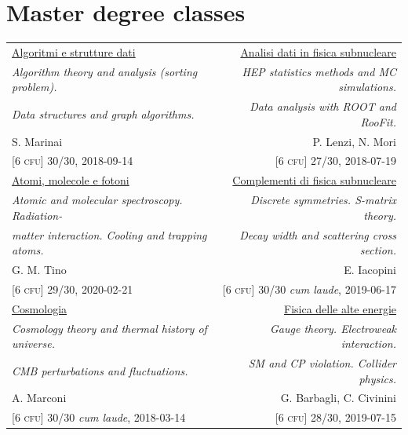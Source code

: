 \documentclass[a4, 11pt]{report}
\begin{document}
    \pagebreak

    \section*{Master degree classes}
        \begin{tabular*}{\textwidth}{l @{\extracolsep{\fill}} r}
            {\ul {Algoritmi e strutture dati}} & {\ul {Analisi dati in fisica subnucleare}}\\
            {\small \emph {Algorithm theory and analysis (sorting problem).}} & {\small \emph {HEP statistics methods and MC simulations.}}\\
            {\small \emph {Data structures and graph algorithms.}} & {\small \emph {Data analysis with ROOT and RooFit.}}\\
            {\small S. Marinai} & {\small P. Lenzi, N. Mori}\\
            {\small [6 \textsc{cfu}] 30/30, 2018-09-14} & {\small [6 \textsc{cfu}] 27/30, 2018-07-19}\\ [3mm]

            {\ul {Atomi, molecole e fotoni}} & {\ul {Complementi di fisica subnucleare}}\\
            {\small \emph {Atomic and molecular spectroscopy. Radiation-}} & {\small \emph {Discrete symmetries. S-matrix theory.}}\\
            {\small \emph {matter interaction. Cooling and trapping atoms.}} & {\small \emph {Decay width and scattering cross section.}}\\
            {\small G. M. Tino} & {\small E. Iacopini}\\
            {\small [6 \textsc{cfu}] 29/30, 2020-02-21} & {\small [6 \textsc{cfu}] 30/30 \textit{cum laude}, 2019-06-17}\\ [3mm]

            {\ul {Cosmologia}} & {\ul {Fisica delle alte energie}}\\
            {\small \emph {Cosmology theory and thermal history of universe.}} & {\small \emph {Gauge theory. Electroweak interaction.}}\\
            {\small \emph {CMB perturbations and fluctuations.}} & {\small \emph {SM and CP violation. Collider physics.}}\\
            {\small A. Marconi} & {\small G. Barbagli, C. Civinini}\\
            {\small [6 \textsc{cfu}] 30/30 \textit{cum laude}, 2018-03-14} & {\small [6 \textsc{cfu}] 28/30, 2019-07-15}\\ [3mm]


\end{tabular*}
\end{document}
